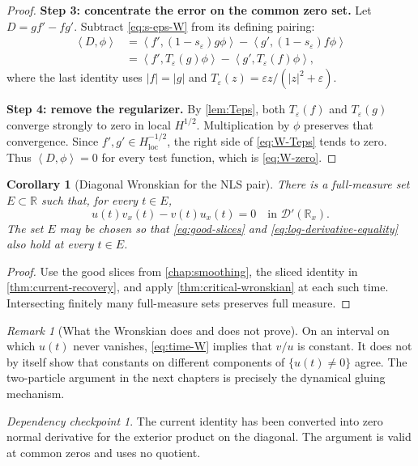 \documentclass[11pt,oneside]{book}
\newtheorem{corollary}[theorem]{Corollary}
\theoremstyle{definition}
\theoremstyle{remark}
\newtheorem{remark}[theorem]{Remark}
\newtheorem{checkpoint}[theorem]{Dependency checkpoint}
\newcommand{\R}{\mathbb R}
\newcommand{\D}{\mathcal D}
\newcommand{\1}{\mathbf 1}
\newcommand{\loc}{\mathrm{loc}}
\newcommand{\pair}[2]{\left\langle #1,#2\right\rangle}
\newcommand{\eps}{\varepsilon}
\begin{document}
\begin{proof}
\textbf{Step 3: concentrate the error on the common zero set.}
Let $D=gf'-fg'$.  Subtract \eqref{eq:s-eps-W} from its defining pairing:
\begin{align}
 \pair D\phi
 &=\pair{f'}{(1-s_\eps)g\phi}
   -\pair{g'}{(1-s_\eps)f\phi}\\
 &=\pair{f'}{T_\eps(g)\phi}
   -\pair{g'}{T_\eps(f)\phi},                      \label{eq:W-Teps}
\end{align}
where the last identity uses $|f|=|g|$ and
$T_\eps(z)=\eps z/(|z|^2+\eps)$.

\textbf{Step 4: remove the regularizer.}
By \cref{lem:Teps}, both $T_\eps(f)$ and $T_\eps(g)$ converge strongly to
zero in local $H^{1/2}$.  Multiplication by $\phi$ preserves that convergence.
Since $f',g'\in H^{-1/2}_{\loc}$, the right side of \eqref{eq:W-Teps} tends
to zero.  Thus $\pair D\phi=0$ for every test function, which is
\eqref{eq:W-zero}.
\end{proof}

\begin{corollary}[Diagonal Wronskian for the NLS pair]\label{cor:diagonal-W}
There is a full-measure set $E\subset\R$ such that, for every $t\in E$,
\begin{equation}
 u(t)v_x(t)-v(t)u_x(t)=0
 \quad\text{in }\D'(\R_x).                         \label{eq:time-W}
\end{equation}
The set $E$ may be chosen so that \eqref{eq:good-slices} and
\eqref{eq:log-derivative-equality} also hold at every $t\in E$.
\end{corollary}

\begin{proof}
Use the good slices from \cref{chap:smoothing}, the sliced identity in
\cref{thm:current-recovery}, and apply \cref{thm:critical-wronskian} at each
such time.  Intersecting finitely many full-measure sets preserves full
measure.
\end{proof}

\begin{remark}[What the Wronskian does and does not prove]
On an interval on which $u(t)$ never vanishes, \eqref{eq:time-W} implies that
$v/u$ is constant.  It does not by itself show that constants on different
components of $\{u(t)\ne0\}$ agree.  The two-particle argument in the next
chapters is precisely the dynamical gluing mechanism.
\end{remark}

\begin{checkpoint}
The current identity has been converted into zero normal derivative for the
exterior product on the diagonal.  The argument is valid at common zeros and
uses no quotient.
\end{checkpoint}
\end{document}
